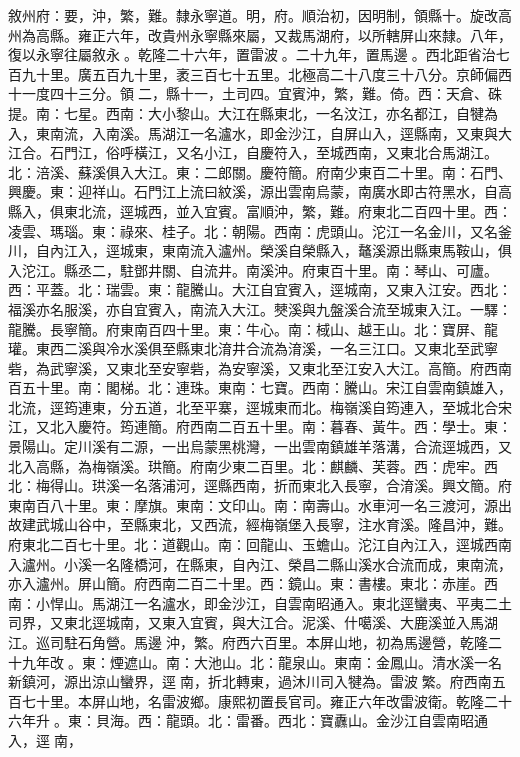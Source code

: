 \begin{pinyinscope}
敘州府：要，沖，繁，難。隸永寧道。明，府。順治初，因明制，領縣十。旋改高州為高縣。雍正六年，改貴州永寧縣來屬，又裁馬湖府，以所轄屏山來隸。八年，復以永寧往屬敘永。乾隆二十六年，置雷波。二十九年，置馬邊。西北距省治七百九十里。廣五百九十里，袤三百七十五里。北極高二十八度三十八分。京師偏西十一度四十三分。領二，縣十一，土司四。宜賓沖，繁，難。倚。西：天倉、硃提。南：七星。西南：大小黎山。大江在縣東北，一名汶江，亦名都江，自犍為入，東南流，入南溪。馬湖江一名瀘水，即金沙江，自屏山入，逕縣南，又東與大江合。石門江，俗呼橫江，又名小江，自慶符入，至城西南，又東北合馬湖江。北：涪溪、蘇溪俱入大江。東：二郎關。慶符簡。府南少東百二十里。南：石門、興慶。東：迎祥山。石門江上流曰紋溪，源出雲南烏蒙，南廣水即古符黑水，自高縣入，俱東北流，逕城西，並入宜賓。富順沖，繁，難。府東北二百四十里。西：凌雲、瑪瑙。東：祿來、桂子。北：朝陽。西南：虎頭山。沱江一名金川，又名釜川，自內江入，逕城東，東南流入瀘州。榮溪自榮縣入，鼇溪源出縣東馬鞍山，俱入沱江。縣丞二，駐鄧井關、自流井。南溪沖。府東百十里。南：琴山、可廬。西：平蓋。北：瑞雲。東：龍騰山。大江自宜賓入，逕城南，又東入江安。西北：福溪亦名服溪，亦自宜賓入，南流入大江。僰溪與九盤溪合流至城東入江。一驛：龍騰。長寧簡。府東南百四十里。東：牛心。南：棫山、越王山。北：寶屏、龍瓘。東西二溪與冷水溪俱至縣東北淯井合流為淯溪，一名三江口。又東北至武寧砦，為武寧溪，又東北至安寧砦，為安寧溪，又東北至江安入大江。高簡。府西南百五十里。南：閣梯。北：連珠。東南：七寶。西南：騰山。宋江自雲南鎮雄入，北流，逕筠連東，分五道，北至平寨，逕城東而北。梅嶺溪自筠連入，至城北合宋江，又北入慶符。筠連簡。府西南二百五十里。南：暮春、黃牛。西：學士。東：景陽山。定川溪有二源，一出烏蒙黑桃灣，一出雲南鎮雄羊落溝，合流逕城西，又北入高縣，為梅嶺溪。珙簡。府南少東二百里。北：麒麟、芙蓉。西：虎牢。西北：梅得山。珙溪一名落浦河，逕縣西南，折而東北入長寧，合淯溪。興文簡。府東南百八十里。東：摩旗。東南：文印山。南：南壽山。水車河一名三渡河，源出故建武城山谷中，至縣東北，又西流，經梅嶺堡入長寧，注水育溪。隆昌沖，難。府東北二百七十里。北：道觀山。南：回龍山、玉蟾山。沱江自內江入，逕城西南入瀘州。小溪一名隆橋河，在縣東，自內江、榮昌二縣山溪水合流而成，東南流，亦入瀘州。屏山簡。府西南二百二十里。西：鏡山。東：書樓。東北：赤崖。西南：小悍山。馬湖江一名瀘水，即金沙江，自雲南昭通入。東北逕蠻夷、平夷二土司界，又東北逕城南，又東入宜賓，與大江合。泥溪、什噶溪、大鹿溪並入馬湖江。巡司駐石角營。馬邊沖，繁。府西六百里。本屏山地，初為馬邊營，乾隆二十九年改。東：煙遮山。南：大池山。北：龍泉山。東南：金鳳山。清水溪一名新鎮河，源出涼山蠻界，逕南，折北轉東，過沐川司入犍為。雷波繁。府西南五百七十里。本屏山地，名雷波鄉。康熙初置長官司。雍正六年改雷波衛。乾隆二十六年升。東：貝海。西：龍頭。北：雷番。西北：寶纛山。金沙江自雲南昭通入，逕南，


\end{pinyinscope}
